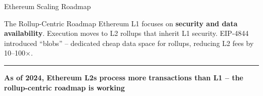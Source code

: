 \documentclass[8pt,aspectratio=169]{beamer}
\newcommand{\bottomnote}[1]{\vfill\vspace{-2mm}\textcolor{mllavender2}{\rule{\textwidth}{0.4pt}}\vspace{1mm}\footnotesize\textbf{#1}}
\begin{document}
\begin{frame}{Ethereum Scaling Roadmap}
\begin{center}
\end{center}
\vspace{1mm}
\begin{alertblock}{The Rollup-Centric Roadmap}
\small Ethereum L1 focuses on \textbf{security and data availability}. Execution moves to L2 rollups that inherit L1 security. EIP-4844 introduced ``blobs'' -- dedicated cheap data space for rollups, reducing L2 fees by 10--100$\times$.
\end{alertblock}
\bottomnote{As of 2024, Ethereum L2s process more transactions than L1 -- the rollup-centric roadmap is working}
\end{frame}

\end{document}
